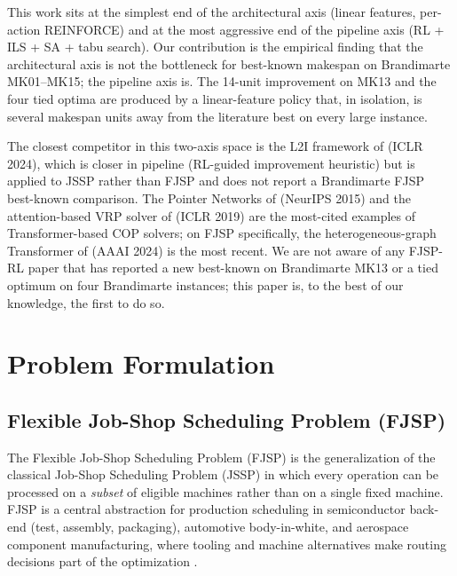 \documentclass[10pt]{article}
\theoremstyle{definition}
\begin{document}
This work sits at the simplest end of the
architectural axis (linear features, per-action
REINFORCE) and at the most aggressive end of the
pipeline axis (RL + ILS + SA + tabu search). Our
contribution is the empirical finding that the
architectural axis is not the bottleneck for
best-known makespan on Brandimarte MK01--MK15; the
pipeline axis is. The 14-unit improvement on MK13 and
the four tied optima are produced by a linear-feature
policy that, in isolation, is several makespan units
away from the literature best on every large instance.

The closest competitor in this two-axis space is the
L2I framework of \citet{Zhang2024L2I} (ICLR 2024),
which is closer in pipeline (RL-guided improvement
heuristic) but is applied to JSSP rather than FJSP and
does not report a Brandimarte FJSP best-known
comparison. The Pointer Networks of \citet{Vinyals2015}
(NeurIPS 2015) and the attention-based VRP solver of
\citet{Kool2019} (ICLR 2019) are the most-cited examples
of Transformer-based COP solvers; on FJSP specifically,
the heterogeneous-graph Transformer of \citet{Yang2024}
(AAAI 2024) is the most recent. We are not aware of any
FJSP-RL paper that has reported a new best-known on
Brandimarte MK13 or a tied optimum on four Brandimarte
instances; this paper is, to the best of our knowledge,
the first to do so.

\section{Problem Formulation}

\subsection{Flexible Job-Shop Scheduling Problem (FJSP)}

The Flexible Job-Shop Scheduling Problem (FJSP) is the
generalization of the classical Job-Shop Scheduling Problem
(JSSP) in which every operation can be processed on a
\emph{subset} of eligible machines rather than on a single
fixed machine. FJSP is a central abstraction for production
scheduling in semiconductor back-end (test, assembly,
packaging), automotive body-in-white, and aerospace component
manufacturing, where tooling and machine alternatives make
routing decisions part of the optimization \citep{Jain2016,
Zhang2018}.
\end{document}
